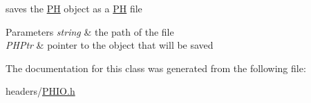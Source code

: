 saves the \hyperlink{class_p_h}{\-P\-H} object as a \hyperlink{class_p_h}{\-P\-H} file 


\begin{DoxyParams}{\-Parameters}
{\em string} & the path of the file \\
\hline
{\em \-P\-H\-Ptr} & pointer to the object that will be saved \\
\hline
\end{DoxyParams}


\-The documentation for this class was generated from the following file\-:\begin{DoxyCompactItemize}
\item 
headers/\hyperlink{_p_h_i_o_8h}{\-P\-H\-I\-O.\-h}\end{DoxyCompactItemize}
